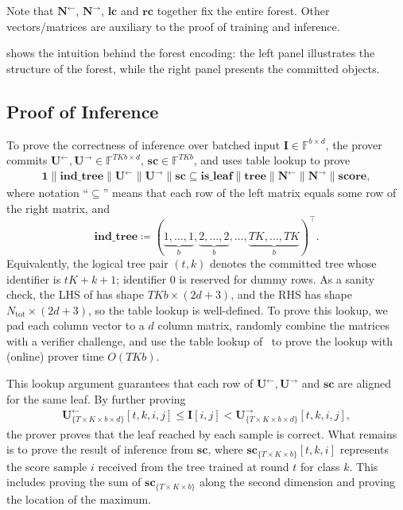 Note that $\mathbf{N}^{\leftarrow}$, $\mathbf{N}^{\rightarrow}$, $\mathbf{lc}$
and $\mathbf{rc}$ together fix the entire forest.
Other vectors/matrices are auxiliary to the proof
of training and inference.

 shows the intuition behind
the forest encoding: the left panel illustrates the structure of the forest,
while the right panel presents the committed objects.



\subsection{Proof of Inference}\label{subsec:method-inference}

To prove the correctness of inference over batched input $\mathbf{I}\in\mathbb{F}^{b\times d}$,
the prover commits $\mathbf{U}^{\leftarrow}, \mathbf{U}^{\rightarrow}\in \mathbb{F}^{TKb\times d}$,
$\mathbf{sc}\in\mathbb{F}^{TKb}$,
and uses table lookup to prove
\begin{align}
  \mathbf{1} \| \mathbf{ind\_tree}  \| \mathbf{U} ^{\leftarrow } \| \mathbf{U} ^{\rightarrow } \| \mathbf{sc} \subseteq
  \mathbf{is\_leaf} \| \mathbf{tree} \| \mathbf{N} ^{\leftarrow }\| \mathbf{N} ^{\rightarrow }\| \mathbf{score},\label{eq:inference-lookup-1}
\end{align}
where notation ``$\subseteq$'' means that each row of the left matrix equals some row of the right matrix, and
\[
\mathbf{ind\_tree} \coloneqq (\underbrace{1, \dots, 1}_b, \underbrace{2, \dots, 2}_{b}, \dots, \underbrace{TK, \dots, TK}_b)^\top.
\]
Equivalently, the logical tree pair $(t,k)$ denotes the committed tree whose
identifier is $tK+k+1$; identifier $0$ is reserved for dummy rows.
As a sanity check,
the LHS of  has shape $TKb\times (2d+3)$,
and the RHS has shape $N_{\mathrm{tot}}\times (2d+3)$, so the table lookup is well-defined.
To prove this lookup, we pad each column vector to a $d$ column matrix,
randomly combine the matrices with a verifier challenge,
and use the table lookup of~\cite{cq++24} to prove the lookup
with (online) prover time $O(TKb)$.

This lookup argument guarantees that each row of 
$\mathbf{U}^{\leftarrow}, \mathbf{U}^{\rightarrow}$
and $\mathbf{sc}$ are aligned for the same leaf.
By further proving
\begin{align}
  \mathbf{U} ^{\leftarrow }_{\{T\times K\times b\times d\}}[t, k, i, j] \leq \mathbf{I}[i,j] < \mathbf{U}_{\{T\times K\times b\times d\}} ^{\rightarrow }[t, k, i, j], \label{eq:inference-interval}
\end{align}
the prover proves that the leaf reached by each sample is correct.
What remains is to prove the result of inference from $\mathbf{sc}$,
where $\mathbf{sc}_{\{T\times K\times b\}}[t,k,i]$ represents the score sample $i$
received from the tree trained at round $t$ for class $k$.
This includes proving the sum of $\mathbf{sc}_{\{T\times K\times b\}}$
along the second dimension and proving the location of the maximum.

